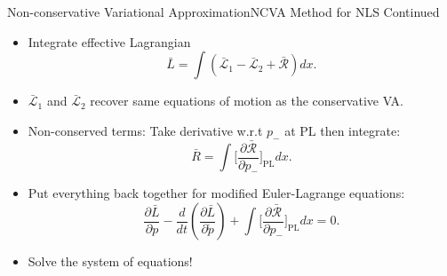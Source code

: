 \begin{frame}[c]{Non-conservative Variational Approximation}{NCVA Method for NLS Continued}
\small{
\begin{itemize}
\item  Integrate effective Lagrangian
\[ \bar{L} = \int \left(\bar{\mathcal{L}}_1 - \bar{\mathcal{L}}_2+ \bar{\mathcal{R}} \right)dx. \]
\item $\bar{\mathcal{L}}_1$ and $\bar{\mathcal{L}}_2$ recover same equations of motion as the conservative VA. 
\item Non-conserved terms:  Take derivative w.r.t $p_-$ at $\mathrm{PL}$ then integrate: 
\[ \bar{R} = \int \Bigg[ \frac{\partial \bar{\mathcal{R}}}{\partial p_-} \Bigg]_{\mathrm{PL}} dx.   \] 
\item Put everything back together for \textcolor{paleblue}{modified Euler-Lagrange equations}:
\[ \frac{\partial \bar{L}}{\partial p} - \frac{d}{dt} \left( \frac{\partial \bar{L} }{\partial\dot{p}} \right) + \int  \Bigg[ \frac{\partial \bar{\mathcal{R}}}{\partial p_-} \Bigg]_{\mathrm{PL}} dx = 0. \]
\item Solve the system of equations!
\end{itemize} 
}
\end{frame}


